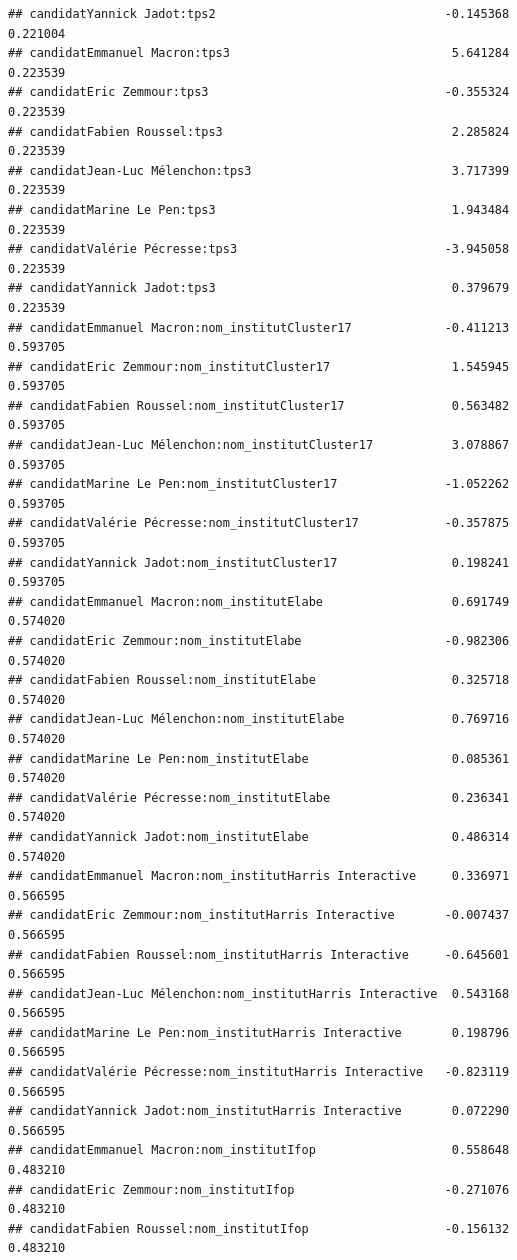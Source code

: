 \documentclass[
]{book}
\begin{document}
\begin{verbatim}
## candidatYannick Jadot:tps2                                -0.145368   0.221004
## candidatEmmanuel Macron:tps3                               5.641284   0.223539
## candidatEric Zemmour:tps3                                 -0.355324   0.223539
## candidatFabien Roussel:tps3                                2.285824   0.223539
## candidatJean-Luc Mélenchon:tps3                            3.717399   0.223539
## candidatMarine Le Pen:tps3                                 1.943484   0.223539
## candidatValérie Pécresse:tps3                             -3.945058   0.223539
## candidatYannick Jadot:tps3                                 0.379679   0.223539
## candidatEmmanuel Macron:nom_institutCluster17             -0.411213   0.593705
## candidatEric Zemmour:nom_institutCluster17                 1.545945   0.593705
## candidatFabien Roussel:nom_institutCluster17               0.563482   0.593705
## candidatJean-Luc Mélenchon:nom_institutCluster17           3.078867   0.593705
## candidatMarine Le Pen:nom_institutCluster17               -1.052262   0.593705
## candidatValérie Pécresse:nom_institutCluster17            -0.357875   0.593705
## candidatYannick Jadot:nom_institutCluster17                0.198241   0.593705
## candidatEmmanuel Macron:nom_institutElabe                  0.691749   0.574020
## candidatEric Zemmour:nom_institutElabe                    -0.982306   0.574020
## candidatFabien Roussel:nom_institutElabe                   0.325718   0.574020
## candidatJean-Luc Mélenchon:nom_institutElabe               0.769716   0.574020
## candidatMarine Le Pen:nom_institutElabe                    0.085361   0.574020
## candidatValérie Pécresse:nom_institutElabe                 0.236341   0.574020
## candidatYannick Jadot:nom_institutElabe                    0.486314   0.574020
## candidatEmmanuel Macron:nom_institutHarris Interactive     0.336971   0.566595
## candidatEric Zemmour:nom_institutHarris Interactive       -0.007437   0.566595
## candidatFabien Roussel:nom_institutHarris Interactive     -0.645601   0.566595
## candidatJean-Luc Mélenchon:nom_institutHarris Interactive  0.543168   0.566595
## candidatMarine Le Pen:nom_institutHarris Interactive       0.198796   0.566595
## candidatValérie Pécresse:nom_institutHarris Interactive   -0.823119   0.566595
## candidatYannick Jadot:nom_institutHarris Interactive       0.072290   0.566595
## candidatEmmanuel Macron:nom_institutIfop                   0.558648   0.483210
## candidatEric Zemmour:nom_institutIfop                     -0.271076   0.483210
## candidatFabien Roussel:nom_institutIfop                   -0.156132   0.483210

\end{verbatim}
\end{document}
